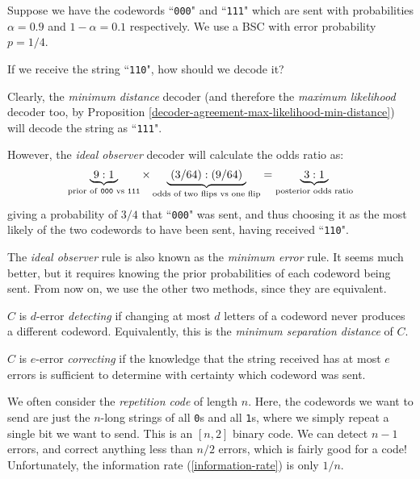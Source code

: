 \documentclass{article}
\begin{document}
\begin{example}
    Suppose we have the codewords
    ``\texttt{000}" and ``\texttt{111}"
    which are  sent with probabilities
    $\alpha = 0.9$ and $1 - \alpha = 0.1$ respectively.
    We use a BSC with error probability $p = 1/4$.
    
    If we receive the string ``\texttt{110}",
    how should we decode it?
    
    Clearly, the \textit{minimum distance} decoder
    (and therefore the \textit{maximum likelihood} decoder too,
    by Proposition \ref{decoder-agreement-max-likelihood-min-distance})
    will decode the string as ``\texttt{111}".
    
    However, the \textit{ideal observer} decoder
    will calculate the odds ratio as:
    \[
	\underbrace{\ 9:1 \ }_
	{\text{prior of \texttt{000} vs \texttt{111}}}
	\times
	\underbrace{\ (3/64) : (9/64) \ }_
	{\text{odds of two flips vs one flip}}
	=
	\underbrace{\ 3 : 1 \ }_
	{\text{posterior odds ratio}}
	\]
	giving a probability of $3/4$ that ``\texttt{000}" was sent,
	and thus choosing it as the most likely of the two codewords to have been sent, 
	having received ``\texttt{110}".
\end{example}

\begin{note}
	The \textit{ideal observer} rule is also known as the \textit{minimum error} rule.
	It seems much better,
	but it requires knowing the prior probabilities of each codeword being sent.
	From now on, we use the other two methods,
	since they are equivalent.
\end{note}

\begin{definition}
	\label{error-detecting-correcting}
	$C$ is $d$-error \textit{detecting}
	if changing at most $d$ letters of a codeword
	never produces a different codeword.
	Equivalently, this is the \textit{minimum separation distance} of $C$.
	
	$C$ is $e$-error \textit{correcting}
	if the knowledge that the string received has at most $e$ errors
	is sufficient to determine with certainty which codeword was sent.
\end{definition}

We often consider the \textit{repetition code} of length $n$.
Here, the codewords we want to send are just
the $n$-long strings of all \texttt{0}s and all \texttt{1}s,
where we simply repeat a single bit we want to send.
This is an $[n, 2]$ binary code.
We can detect $n-1$ errors,
and correct anything less than $n/2$ errors,
which is fairly good for a code!
Unfortunately, the information rate (\ref{information-rate}) is only $1/n$.
\end{document}

